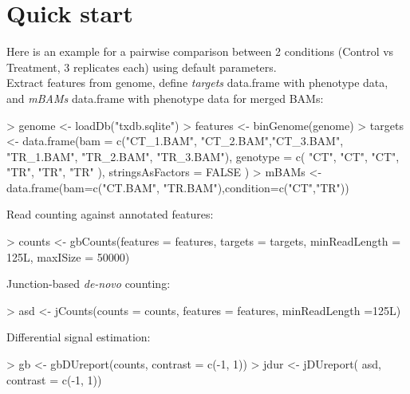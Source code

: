 \documentclass{article}
\begin{document}
\section{Quick start}
Here is an example for a pairwise comparison between 2 conditions (Control vs Treatment, 3 replicates each) using default parameters. \\

Extract features from genome, define {\em targets} data.frame with phenotype data, and {\em mBAMs} data.frame with phenotype data for merged BAMs:

\begin{Schunk}
\begin{Sinput}
> genome   <- loadDb("txdb.sqlite")
> features <- binGenome(genome)
> targets  <- data.frame(bam = c("CT_1.BAM", "CT_2.BAM","CT_3.BAM",
                                "TR_1.BAM", "TR_2.BAM", "TR_3.BAM"),
                   genotype = c( "CT", "CT", "CT",  "TR", "TR", "TR" ),
                   stringsAsFactors = FALSE )
> mBAMs <- data.frame(bam=c("CT.BAM", "TR.BAM"),condition=c("CT","TR"))
\end{Sinput}
\end{Schunk}

Read counting against annotated features: 

\begin{Schunk}
\begin{Sinput}
> counts      <-  gbCounts(features = features, 
                          targets  = targets, 
                          minReadLength = 125L, 
                          maxISize = 50000)
\end{Sinput}
\end{Schunk}

Junction-based {\em de-novo} counting:

\begin{Schunk}
\begin{Sinput}
> asd         <-  jCounts(counts = counts, 
                         features = features,
                         minReadLength =125L)
\end{Sinput}
\end{Schunk}

Differential signal estimation:

\begin{Schunk}
\begin{Sinput}
> gb        <- gbDUreport(counts, contrast = c(-1, 1))
> jdur      <- jDUreport(    asd, contrast = c(-1, 1))
\end{Sinput}
\end{Schunk}
\end{document}
